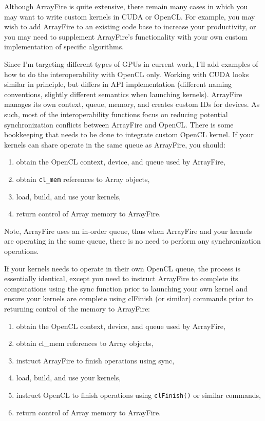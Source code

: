 Although ArrayFire is quite extensive, there remain many cases in which you may want to write custom kernels in CUDA or OpenCL. For example, you may wish to add ArrayFire to an existing code base to increase your productivity, or you may need to supplement ArrayFire's functionality with your own custom implementation of specific algorithms.

Since I'm targeting different types of GPUs in current work, I'll add examples of how to do the interoperability with OpenCL only. Working with CUDA looks similar in principle, but differs in API implementation (different naming conventions, slightly different semantics when launching kernels).
ArrayFire manages its own context, queue, memory, and creates custom IDs for devices. As such, most of the interoperability functions focus on reducing potential synchronization conflicts between ArrayFire and OpenCL. There is some bookkeeping that needs to be done to integrate custom OpenCL kernel. If your kernels can share operate in the same queue as ArrayFire, you should:

\begin{enumerate}
\item obtain the OpenCL context, device, and queue used by ArrayFire,
\item obtain \texttt{cl_mem} references to Array objects,
\item load, build, and use your kernels,
\item return control of Array memory to ArrayFire.
\end{enumerate}

Note, ArrayFire uses an in-order queue, thus when ArrayFire and your kernels are operating in the same queue, there is no need to perform any synchronization operations.

If your kernels needs to operate in their own OpenCL queue, the process is essentially identical, except you need to instruct ArrayFire to complete its computations using the sync function prior to launching your own kernel and ensure your kernels are complete using clFinish (or similar) commands prior to returning control of the memory to ArrayFire:

\begin{enumerate}
\item obtain the OpenCL context, device, and queue used by ArrayFire,
\item obtain cl_mem references to Array objects,
\item instruct ArrayFire to finish operations using sync,
\item load, build, and use your kernels,
\item instruct OpenCL to finish operations using \texttt{clFinish()} or similar commands,
\item return control of Array memory to ArrayFire.
\end{enumerate}

